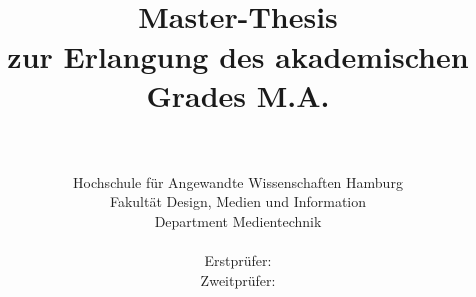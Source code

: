 
\title{\titel\\[2ex]
\LARGE Master-Thesis\\
\large zur Erlangung des akademischen Grades M.A.\\[1.5ex]
\LARGE \vorname~\nachname\\[0.5ex] 
\large \matrikelnummer
}

\author{
\large{}\hspace{1ex}
\parbox[b]{11.2cm}{\sffamily\large%
Hochschule f\"ur Angewandte Wissenschaften Hamburg\\[-0.2ex]
Fakult\"at Design, Medien und Information\\[-0.2ex]
Department Medientechnik
}\\[6ex]
\sffamily\large Erstpr\"ufer: \erstpruef\\[0.5ex]
\sffamily\large Zweitpr\"ufer: \zweitpruef}

